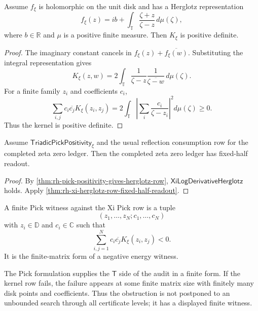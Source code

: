 \begin{theorem}
\label{thm:rh-herglotz-row-gives-pick-positivity}
Assume $f_{\xi}$ is holomorphic on the unit disk and has a Herglotz
representation
$$
f_{\xi}(z)
=
ib+
\int_{\mathbb T}\frac{\zeta+z}{\zeta-z}\,d\mu(\zeta),
$$
where $b\in\mathbb R$ and $\mu$ is a positive finite measure.  Then
$K_{\xi}$ is positive definite.
\end{theorem}

\begin{proof}
The imaginary constant cancels in
$f_{\xi}(z)+\overline{f_{\xi}(w)}$.  Substituting the integral
representation gives
$$
K_{\xi}(z,w)
=
2\int_{\mathbb T}
\frac{1}{\zeta-z}
\frac{1}{\overline{\zeta-w}}
\,d\mu(\zeta).
$$
For a finite family $z_i$ and coefficients $c_i$,
$$
\sum_{i,j}c_i\overline{c_j}K_{\xi}(z_i,z_j)
=
2\int_{\mathbb T}
\left|
\sum_i\frac{c_i}{\zeta-z_i}
\right|^2
d\mu(\zeta)
\ge0.
$$
Thus the kernel is positive definite.
\end{proof}

\begin{corollary}
\label{cor:rh-pick-positivity-fixed-half-readout}
Assume $\mathsf{TriadicPickPositivity}_{\xi}$ and the usual reflection
consumption row for the completed zeta zero ledger.  Then the completed
zeta zero ledger has fixed-half readout.
\end{corollary}

\begin{proof}
By \autoref{thm:rh-pick-positivity-gives-herglotz-row},
$\mathsf{XiLogDerivativeHerglotz}$ holds.  Apply
\autoref{thm:rh-xi-herglotz-row-fixed-half-readout}.
\end{proof}

\begin{definition}
\label{def:rh-finite-pick-witness}
A finite Pick witness against the Xi Pick row is a tuple
$$
(z_1,\ldots,z_N;c_1,\ldots,c_N)
$$
with $z_i\in\mathbb D$ and $c_i\in\mathbb C$ such that
$$
\sum_{i,j=1}^{N}
c_i\overline{c_j}K_{\xi}(z_i,z_j)<0.
$$
It is the finite-matrix form of a negative energy witness.
\end{definition}

\begin{principle}
\label{prin:rh-pick-witness-time-side}
The Pick formulation supplies the $\mathsf T$ side of the audit in a
finite form.  If the kernel row fails, the failure appears at some
finite matrix size with finitely many disk points and coefficients.
Thus the obstruction is not postponed to an unbounded search through
all certificate levels; it has a displayed finite witness.
\end{principle}

